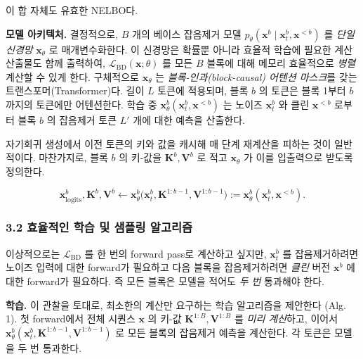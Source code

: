 \documentclass[
]{article}
\begin{document}
이 합 자체도 유효한 NELBO다.

\textbf{모델 아키텍처.} 결정적으로, \(B\) 개의 베이스 잡음제거 모델
\(p_\theta(\mathbf{x}^b \mid \mathbf{x}^b_t, \mathbf{x}^{< b})\) 를
\emph{단일 신경망} \(\mathbf{x}_\theta\) 로 매개변수화한다. 이 신경망은
확률뿐 아니라 효율적 학습에 필요한 계산 산출물도 함께 출력하여,
\(\mathcal{L}_\text{BD}(\mathbf{x}; \theta)\) 를 모든 \(B\) 블록에 대해
메모리 효율적으로 \emph{병렬} 계산할 수 있게 한다. 구체적으로
\(\mathbf{x}_\theta\) 는 \emph{블록-인과(block-causal) 어텐션 마스크}를
갖는 트랜스포머(Transformer)다. 길이 \(L\) 토큰에 적용되며, 블록 \(b\)
의 토큰은 블록 1부터 \(b\) 까지의 토큰에만 어텐션한다. 학습 중
\(\mathbf{x}^b_\theta(\mathbf{x}^b_t, \mathbf{x}^{< b})\) 는 노이즈
\(\mathbf{x}^b_t\) 와 클린 \(\mathbf{x}^{< b}\) 로부터 블록 \(b\) 의
잡음제거 토큰 \(L'\) 개에 대한 예측을 산출한다.

자기회귀 생성에서 이전 토큰의 키와 값을 캐시해 매 단계 재계산을 피하는
것이 일반적이다. 마찬가지로, 블록 \(b\) 의 키-값을
\(\mathbf{K}^b, \mathbf{V}^b\) 로 적고 \(\mathbf{x}_\theta\) 가 이를
입출력으로 받도록 정의한다.

\[
\mathbf{x}^b_\text{logits}, \mathbf{K}^b, \mathbf{V}^b \gets \mathbf{x}^b_\theta\big(\mathbf{x}^b_t, \mathbf{K}^{1:b-1}, \mathbf{V}^{1:b-1}\big) := \mathbf{x}^b_\theta(\mathbf{x}^b_t, \mathbf{x}^{< b}).
\]

\hypertarget{uxd6a8uxc728uxc801uxc778-uxd559uxc2b5-uxbc0f-uxc0d8uxd50cuxb9c1-uxc54cuxace0uxb9acuxc998}{%
\subsubsection{3.2 효율적인 학습 및 샘플링
알고리즘}\label{uxd6a8uxc728uxc801uxc778-uxd559uxc2b5-uxbc0f-uxc0d8uxd50cuxb9c1-uxc54cuxace0uxb9acuxc998}}

이상적으로는 \(\mathcal{L}_\text{BD}\) 를 한 번의 forward pass로
계산하고 싶지만, \(\mathbf{x}^b_t\) 를 잡음제거하려면 노이즈 입력에 대한
forward가 필요하고 다음 블록을 잡음제거하려면 \emph{클린} 버전
\(\mathbf{x}^b\) 에 대한 forward가 필요하다. 즉 모든 블록은 모델을
적어도 \emph{두 번} 통과해야 한다.

\textbf{학습.} 이 관찰을 토대로, 최소한의 계산만 요구하는 학습
알고리즘을 제안한다 (Alg. 1). 첫 forward에서 전체 시퀀스 \(\mathbf{x}\)
의 키-값 \(\mathbf{K}^{1:B}, \mathbf{V}^{1:B}\) 를 \emph{미리 계산}하고,
이어서
\(\mathbf{x}^b_\theta(\mathbf{x}^b_t, \mathbf{K}^{1:b-1}, \mathbf{V}^{1:b-1})\)
로 모든 블록의 잡음제거 예측을 계산한다. 각 토큰은 모델을 두 번
통과한다.
\end{document}
